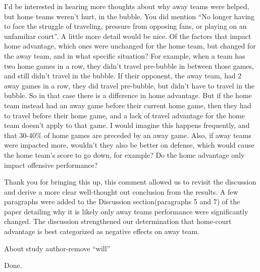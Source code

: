 \documentclass[12pt]{article}
\newenvironment{comment}%
{\begin{quoting}\noindent\small\it\ignorespaces%
  }{\end{quoting}}
\begin{document}
\begin{comment}
I’d be interested in hearing more thoughts about why away teams were helped,
but home teams weren’t hurt, in the bubble. You did mention “No longer having
to face the struggle of traveling, pressure from opposing fans, or playing on
an unfamiliar court”. A little more detail would be nice. Of the factors that
impact home advantage, which ones were unchanged for the home team, but
changed for the away team, and in what specific situation?
For example, when a team has two home games in a row, they didn’t travel 
pre-bubble in between those games, and still didn’t travel in the bubble. If 
their opponent, the away team, had 2 away games in a row, they did travel pre-bubble,
but didn’t have to travel in the bubble. So in that case there is a difference in home advantage.
But if the home team instead had an away game before their current home game,
then they had to travel before their home game, and a lack of travel advantage
for the home team doesn’t apply to that game. I would imagine this happens 
frequently, and that 30-40\% of home games are preceded by an away game.
Also, if away teams were impacted more, wouldn’t they also be better on 
defense, which would cause the home team’s score to go down, for example?
Do the home advantage only impact offensive performance?
\end{comment}

 Thank you for bringing this up, this comment allowed us to revisit the discussion 
 and derive a more clear well-thought out conclusion from the results. A few 
 paragraphs were added to the Discussion section(paragraphs 5 and 7) of the paper detailing why
 it is likely only away teams performance were significantly changed. The 
 discussion strengthened our determination that home-court advantage is best 
 categorized as negative effects on away team.

\begin{comment}
About study author-remove “will”
\end{comment}

Done.




\end{document}
